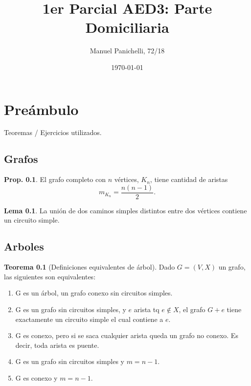 \documentclass[12pt, a4paper]{report}
\title{1er Parcial AED3: Parte Domiciliaria}
\author{Manuel Panichelli, 72/18}
\date{\today}
\theoremstyle{definition} %
\newtheorem{theorem}{Teorema}
\newtheorem{lemma}{Lema}
\newtheorem{proposition}{Prop.}
\begin{document}
\maketitle
\newpage

\chapter*{Preámbulo}

Teoremas / Ejercicios utilizados.

\section{Grafos}

\begin{proposition}\label{grafos/k_n}
    El grafo completo con $n$ vértices, $K_n$, tiene cantidad de aristas
    \[ m_{K_n} = \frac{n(n-1)}{2}. \]
\end{proposition}

\begin{lemma}\label{grafos/union-caminos}
    La unión de dos caminos simples distintos entre dos vértices contiene un circuito simple.
\end{lemma}

\section{Arboles}

\begin{theorem}[Definiciones equivalentes de árbol]\label{teo:tree-equiv}
    Dado $G = (V, X)$ un grafo, las siguientes son equivalentes:

    \begin{enumerate}
        \item G es un árbol, un grafo conexo sin circuitos simples.
        \item G es un grafo sin circuitos simples, y $e$ arista tq $e \notin X$,
        el grafo $G + e$ tiene exactamente un circuito simple el cual contiene a
        $e$.\label{teo:tree-equiv-circ}
        \item G es conexo, pero si se saca cualquier arista queda un grafo no
        conexo. Es decir, toda arista es puente.\label{teo:tree-equiv-puentes}

        \item G es un grafo sin circuitos simples y $m=n-1$.
        \item G es conexo y $m=n-1$.\label{teo:tree/equiv/conexo-n-1}
    \end{enumerate}
\end{theorem}
\end{document}
